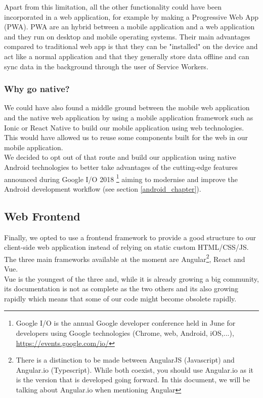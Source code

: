 \documentclass[twoside, openright,11pt,a4paper]{book}
\begin{document}
Apart from this limitation, all the other functionality could have been incorporated in a web application, for example by making a Progressive Web App (PWA)\cite{google:pwa:website}. PWA are an hybrid between a mobile application and a web application and they run on desktop and mobile operating systems. Their main advantages compared to traditional web app is that they can be "installed" on the device and act like a normal application and that they generally store data offline and can sync data in the background through the user of Service Workers.
\subsubsection{Why go native?}
We could have also found a middle ground between the mobile web application and the native web application by using a mobile application framework such as Ionic or React Native to build our mobile application using web technologies. This would have allowed us to reuse some components built for the web in our mobile application.\\

We decided to opt out of that route and build our application using native Android technologies to better take advantages of the cutting-edge features announced during Google I/O 2018 \footnote{Google I/O is the annual Google developer conference held in June for developers using Google technologies (Chrome, web, Android, iOS,...), \url{https://events.google.com/io/}} aiming to modernise and improve the Android development workflow (see section \ref{android_chapter}).
\subsection{Web Frontend}
Finally, we opted to use a frontend framework to provide a good structure to our client-side web application instead of relying on static custom HTML/CSS/JS.\\

The three main frameworks available at the moment are Angular\footnote{There is a distinction to be made between AngularJS (Javascript) and Angular.io (Typescript). While both coexist, you should use Angular.io as it is the version that is developed going forward. In this document, we will be talking about Angular.io when mentioning Angular}, React and Vue. \\

Vue is the youngest of the three and, while it is already growing a big community, its documentation is not as complete as the two others and its also growing rapidly which means that some of our code might become obsolete rapidly. \\
\end{document}
